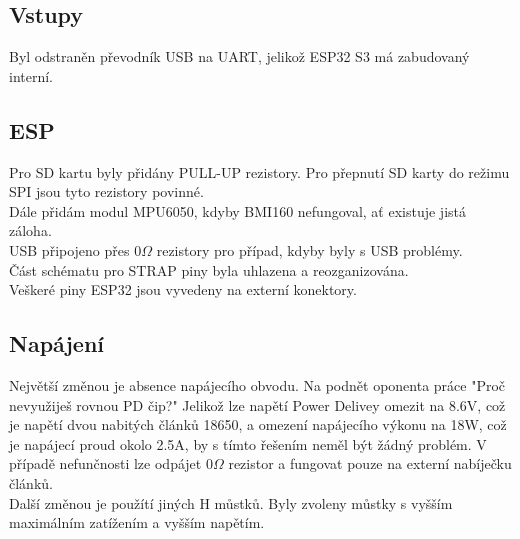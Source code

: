 \subsection{Vstupy}
Byl odstraněn převodník USB na UART, jelikož ESP32 S3 má zabudovaný interní.
\newpage

\subsection{ESP}
Pro SD kartu byly přidány PULL-UP rezistory. Pro přepnutí SD karty do režimu SPI jsou tyto rezistory povinné.\\
Dále přidám modul MPU6050, kdyby BMI160 nefungoval, ať existuje jistá záloha.\\
USB připojeno přes $0 \Omega$ rezistory pro případ, kdyby byly s USB problémy.\\
Část schématu pro STRAP piny byla uhlazena a reozganizována.\\
Veškeré piny ESP32 jsou vyvedeny na externí konektory.


\newpage

\subsection{Napájení}
Největší změnou je absence napájecího obvodu. Na podnět oponenta práce "Proč nevyužiješ rovnou PD čip?" Jelikož lze napětí Power Delivey omezit na 8.6V, což je napětí dvou nabitých článků 18650, a omezení napájecího výkonu na 18W, což je napájecí proud okolo 2.5A, by s tímto řešením neměl být žádný problém. V případě nefunčnosti lze odpájet $0 \Omega$ rezistor a fungovat pouze na externí nabíječku článků.\\
Další změnou je použítí jiných H můstků. Byly zvoleny můstky s vyšším maximálním zatížením a vyšším napětím.


\newpage





